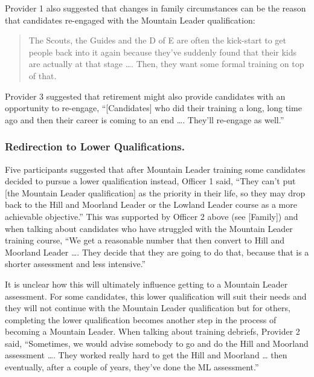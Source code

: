\documentclass[
  12pt,
  a4paper,
]{book}
\begin{document}
Provider 1 also suggested that changes in family circumstances can be the reason that candidates re-engaged with the Mountain Leader qualification:

\begin{quote}
The Scouts, the Guides and the D of E are often the kick-start to get people back into it again because they've suddenly found that their kids are actually at that stage \ldots. Then, they want some formal training on top of that.
\end{quote}

Provider 3 suggested that retirement might also provide candidates with an opportunity to re-engage, ``{[}Candidates{]} who did their training a long, long time ago and then their career is coming to an end \ldots. They'll re-engage as well.''

\hypertarget{ml-qualitative-gta-redirection-lower}{%
\subsubsection{Redirection to Lower Qualifications.}\label{ml-qualitative-gta-redirection-lower}}

Five participants suggested that after Mountain Leader training some candidates decided to pursue a lower qualification instead, Officer 1 said, ``They can't put {[}the Mountain Leader qualification{]} as the priority in their life, so they may drop back to the Hill and Moorland Leader or the Lowland Leader course as a more achievable objective.'' This was supported by Officer 2 above (see {[}Family{]}) and when talking about candidates who have struggled with the Mountain Leader training course, ``We get a reasonable number that then convert to Hill and Moorland Leader \ldots. They decide that they are going to do that, because that is a shorter assessment and less intensive.''

It is unclear how this will ultimately influence getting to a Mountain Leader assessment. For some candidates, this lower qualification will suit their needs and they will not continue with the Mountain Leader qualification but for others, completing the lower qualification becomes another step in the process of becoming a Mountain Leader. When talking about training debriefs, Provider 2 said, ``Sometimes, we would advise somebody to go and do the Hill and Moorland assessment \ldots. They worked really hard to get the Hill and Moorland \ldots{} then eventually, after a couple of years, they've done the ML assessment.''
\end{document}
